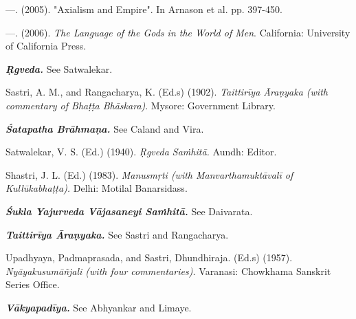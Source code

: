 \begin{thebibliography}{99}
  —. (2005). "Axialism and Empire". In Arnason et al. pp. 397-450.

  —. (2006). \textit{The Language of the Gods in the World of Men}. California: University of California Press.

  \textbf{\textit{Ṛgveda.}} See Satwalekar.

  Sastri, A. M., and Rangacharya, K. (Ed.s) (1902). \textit{Taittirīya Āraṇyaka (with commentary of Bhaṭṭa Bhāskara)}. Mysore: Government Library.

  \textbf{\textit{Śatapatha Brāhmaṇa.}} See Caland and Vira.

  Satwalekar, V. S. (Ed.) (1940). \textit{Ṛgveda Saṁhitā.} Aundh: Editor.

  Shastri, J. L. (Ed.) (1983). \textit{Manusmṛti (with Manvarthamuktāvalī of Kullūkabhaṭṭa).} Delhi: Motilal Banarsidass.

  \textbf{\textit{Śukla Yajurveda Vājasaneyi Saṁhitā.}} See Daivarata.

  \textbf{\textit{Taittirīya Āraṇyaka.}} See Sastri and Rangacharya.

  Upadhyaya, Padmaprasada, and Sastri, Dhundhiraja. (Ed.s) (1957). \textit{Nyāyakusumāñjali (with four commentaries).} Varanasi: Chowkhama Sanskrit Series Office.

  \textbf{\textit{Vākyapadīya.}} See Abhyankar and Limaye.

 \end{thebibliography}

\egroup

\egroup

